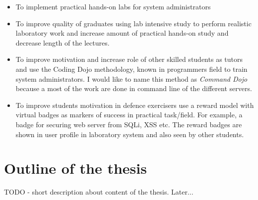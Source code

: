 \begin{itemize}
\item To implement practical hands-on labs for system administrators
\item To improve quality of graduates using lab intensive study  to perform realistic laboratory work and increase amount of practical hands-on study and decrease length of the lectures.
\item To improve motivation and increase role of other skilled students as tutors and use the \gls{Coding Dojo} methodology, known in programmers field to train system administrators. I would like to name this method as \emph{Command Dojo} because a most of the work are done in command line of the different servers.
\item To improve students motivation in defence exercisers use a reward model with virtual badges as markers of success in practical task/field. For example, a badge for securing web server from \gls{SQLi}, \gls{XSS} etc. The reward badges are shown in user profile in laboratory system and also seen by other students.
\end{itemize}
\par


\section{Outline of the thesis}
{\color{red} TODO - short description about content of the thesis. Later... }

 
